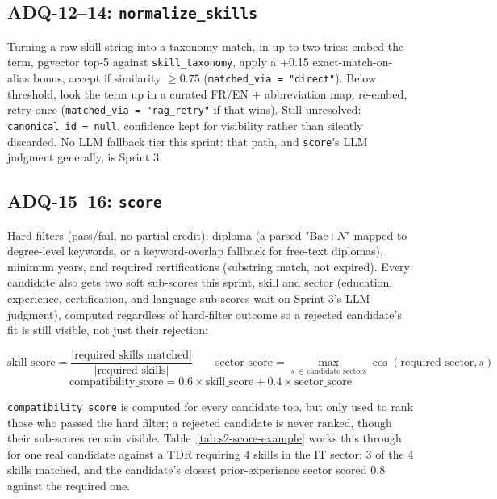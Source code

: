 \subsection{ADQ-12--14: \texttt{normalize\_skills}}

Turning a raw skill string into a taxonomy match, in up to two tries:
embed the term, pgvector top-5 against \texttt{skill\_taxonomy}, apply a
+0.15 exact-match-on-alias bonus, accept if similarity $\geq 0.75$
(\texttt{matched\_via = "direct"}). Below threshold, look the term up in a
curated FR/EN + abbreviation map, re-embed, retry once
(\texttt{matched\_via = "rag\_retry"} if that wins). Still unresolved:
\texttt{canonical\_id = null}, confidence kept for visibility rather than
silently discarded. No LLM fallback tier this sprint: that path, and
\texttt{score}'s LLM judgment generally, is Sprint 3.

\subsection{ADQ-15--16: \texttt{score}}
\label{sec:s2-adq15-16}

Hard filters (pass/fail, no partial credit): diploma (a parsed
"Bac+$N$" mapped to degree-level keywords, or a keyword-overlap fallback
for free-text diplomas), minimum years, and required certifications
(substring match, not expired). Every candidate also gets two soft
sub-scores this sprint, skill and sector (education, experience,
certification, and language sub-scores wait on Sprint 3's LLM
judgment), computed regardless of hard-filter outcome so a rejected
candidate's fit is still visible, not just their rejection:

\[
  \boxed{\text{skill\_score} = \dfrac{|\text{required skills matched}|}
  {|\text{required skills}|}} \qquad
  \boxed{\text{sector\_score} = \max_{s \,\in\, \text{candidate sectors}}
  \cos(\text{required\_sector}, s)}
\]
\[
  \boxed{\text{compatibility\_score} = 0.6 \times \text{skill\_score} +
  0.4 \times \text{sector\_score}}
\]

\texttt{compatibility\_score} is computed for every candidate too, but
only used to rank those who passed the hard filter; a rejected
candidate is never ranked, though their sub-scores remain visible.
Table~\ref{tab:s2-score-example} works this through for one real
candidate against a TDR requiring 4 skills in the IT sector: 3 of the 4
skills matched, and the candidate's closest prior-experience sector
scored 0.8 against the required one.

